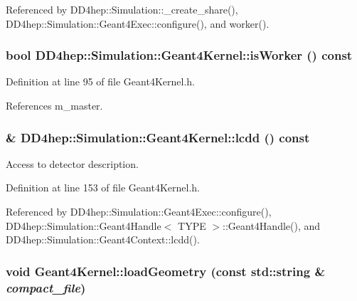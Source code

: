 Referenced by DD4hep::Simulation::\_\-create\_\-share(), DD4hep::Simulation::Geant4Exec::configure(), and worker().\hypertarget{class_d_d4hep_1_1_simulation_1_1_geant4_kernel_a44d5244fccf150aa23c93989bd332128}{
\subsubsection[{isWorker}]{\setlength{\rightskip}{0pt plus 5cm}bool DD4hep::Simulation::Geant4Kernel::isWorker () const}}
\label{class_d_d4hep_1_1_simulation_1_1_geant4_kernel_a44d5244fccf150aa23c93989bd332128}


Definition at line 95 of file Geant4Kernel.h.

References m\_\-master.\hypertarget{class_d_d4hep_1_1_simulation_1_1_geant4_kernel_a172f416447f9f1aa4a1a166b0df902a3}{
\subsubsection[{lcdd}]{\& DD4hep::Simulation::Geant4Kernel::lcdd () const}}
\label{class_d_d4hep_1_1_simulation_1_1_geant4_kernel_a172f416447f9f1aa4a1a166b0df902a3}


Access to detector description. 

Definition at line 153 of file Geant4Kernel.h.

Referenced by DD4hep::Simulation::Geant4Exec::configure(), DD4hep::Simulation::Geant4Handle$<$ TYPE $>$::Geant4Handle(), and DD4hep::Simulation::Geant4Context::lcdd().\hypertarget{class_d_d4hep_1_1_simulation_1_1_geant4_kernel_afe27ed5e3415cd381df461a28015ff81}{
\subsubsection[{loadGeometry}]{\setlength{\rightskip}{0pt plus 5cm}void Geant4Kernel::loadGeometry (const std::string \& {\em compact\_\-file})}}
\label{class_d_d4hep_1_1_simulation_1_1_geant4_kernel_afe27ed5e3415cd381df461a28015ff81}


